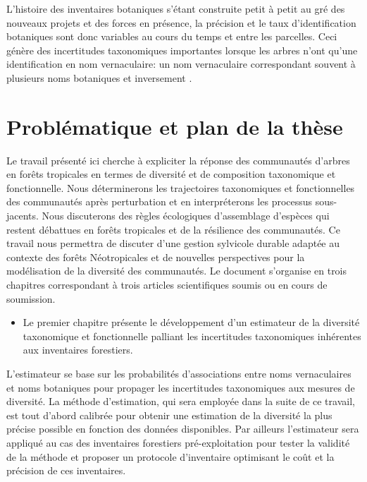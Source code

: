 \documentclass[
  11pt,
  french,
  A4paper,
  extrafontsizes,onecolumn,openright
  ]{memoir}
\providecommand{\tightlist}{%
  \setlength{\itemsep}{0pt}\setlength{\parskip}{0pt}}
\begin{document}
L'histoire des inventaires botaniques s'étant construite petit à petit
au gré des nouveaux projets et des forces en présence, la précision et
le taux d'identification botaniques sont donc variables au cours du
temps et entre les parcelles. Ceci génère des incertitudes taxonomiques
importantes lorsque les arbres n'ont qu'une identification en nom
vernaculaire: un nom vernaculaire correspondant souvent à plusieurs noms
botaniques et inversement \autocite{Oldeman1968}.

\section{Problématique et plan de la
thèse}\label{problematique-et-plan-de-la-these}

Le travail présenté ici cherche à expliciter la réponse des communautés
d'arbres en forêts tropicales en termes de diversité et de composition
taxonomique et fonctionnelle. Nous déterminerons les trajectoires
taxonomiques et fonctionnelles des communautés après perturbation et en
interpréterons les processus sous-jacents. Nous discuterons des règles
écologiques d'assemblage d'espèces qui restent débattues en forêts
tropicales et de la résilience des communautés. Ce travail nous
permettra de discuter d'une gestion sylvicole durable adaptée au
contexte des forêts Néotropicales et de nouvelles perspectives pour la
modélisation de la diversité des communautés. Le document s'organise en
trois chapitres correspondant à trois articles scientifiques soumis ou
en cours de soumission.

\begin{itemize}
\tightlist
\item
  Le premier chapitre présente le développement d'un estimateur de la
  diversité taxonomique et fonctionnelle palliant les incertitudes
  taxonomiques inhérentes aux inventaires forestiers.
\end{itemize}

L'estimateur se base sur les probabilités d'associations entre noms
vernaculaires et noms botaniques pour propager les incertitudes
taxonomiques aux mesures de diversité. La méthode d'estimation, qui sera
employée dans la suite de ce travail, est tout d'abord calibrée pour
obtenir une estimation de la diversité la plus précise possible en
fonction des données disponibles. Par ailleurs l'estimateur sera
appliqué au cas des inventaires forestiers pré-exploitation pour tester
la validité de la méthode et proposer un protocole d'inventaire
optimisant le coût et la précision de ces inventaires.
\end{document}
